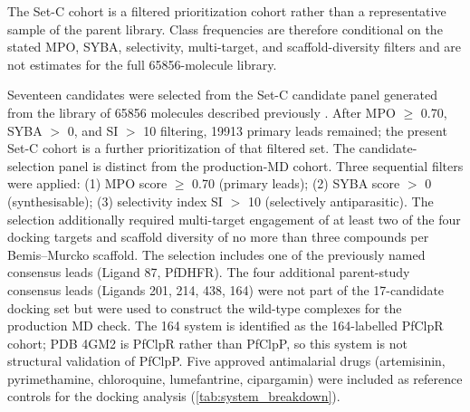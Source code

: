 \documentclass[journal=jcisd8,manuscript=article,layout=traditional]{achemso}
\begin{document}
The Set-C cohort is a filtered prioritization cohort rather than a representative sample of the parent library. Class frequencies are therefore conditional on the stated MPO, SYBA, selectivity, multi-target, and scaffold-diversity filters and are not estimates for the full \num{65856}-molecule library.

Seventeen candidates were selected from the Set-C candidate panel generated from the library of \num{65856} molecules described previously \citep{temgoua2026antimalarial}. After MPO $\geq$ \num{0.70}, SYBA $>$ \num{0}, and SI $>$ \num{10} filtering, \num{19913} primary leads remained; the present Set-C cohort is a further prioritization of that filtered set. The candidate-selection panel is distinct from the production-MD cohort. Three sequential filters were applied: (1) MPO score $\geq$ \num{0.70} (primary leads); (2) SYBA score $>$ \num{0} (synthesisable); (3) selectivity index SI $>$ \num{10} (selectively antiparasitic). The selection additionally required multi-target engagement of at least two of the four docking targets and scaffold diversity of no more than three compounds per Bemis--Murcko scaffold. The selection includes one of the previously named consensus leads (Ligand 87, PfDHFR). The four additional parent-study consensus leads (Ligands 201, 214, 438, 164) were not part of the 17-candidate docking set but were used to construct the wild-type complexes for the production MD check. The 164 system is identified as the 164-labelled PfClpR cohort; PDB 4GM2 is PfClpR rather than PfClpP, so this system is not structural validation of PfClpP. Five approved antimalarial drugs (artemisinin, pyrimethamine, chloroquine, lumefantrine, cipargamin) were included as reference controls for the docking analysis (\cref{tab:system_breakdown}).
\end{document}

